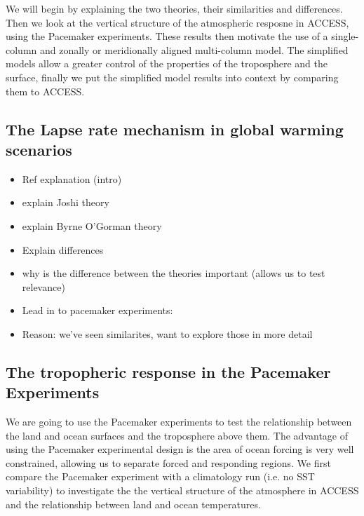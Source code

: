 We will begin by explaining the two theories, their similarities and 
differences. Then we look at the vertical structure of the atmospheric resposne 
in ACCESS, using the Pacemaker experiments. These results then motivate the use 
of a single-column and zonally or meridionally aligned multi-column model. The 
simplified models allow a greater control of the properties of the troposphere 
and the surface, finally we put the simplified model results into context by 
comparing them to ACCESS.

\subsection{The Lapse rate mechanism in global warming scenarios}

\begin{itemize}
	\item Ref explanation (intro)
	\item explain Joshi theory
	\item explain Byrne O'Gorman theory
	\item Explain differences
	\item why is the difference between the theories important (allows us to 
		test relevance)
	\item Lead in to pacemaker experiments:
	\item Reason: we've seen similarites, want to explore those in more detail
\end{itemize}


\subsection{The tropopheric response in the Pacemaker Experiments}

We are going to use the Pacemaker experiments to test the relationship between 
the land and ocean surfaces and the troposphere above them. The advantage of 
using the Pacemaker experimental design is the area of ocean forcing is very 
well constrained, allowing us to separate forced and responding regions.  We 
first compare the Pacemaker experiment with a climatology run (i.e. no SST 
variability) to investigate the the vertical structure of the atmosphere in 
ACCESS and the relationship between land and ocean temperatures.

